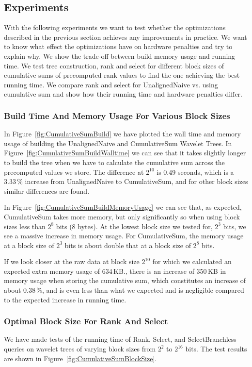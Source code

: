 \subsection{Experiments}
With the following experiments we want to test whether the optimizations described in the previous section achieves any improvements in practice.
We want to know what effect the optimizations have on hardware penalties and try to explain why.
We show the trade-off between build memory usage and running time.
We test tree construction, rank and select for different block sizes of cumulative sums of precomputed rank values to find the one achieving the best running time.
We compare rank and select for UnalignedNaive vs. using cumulative sum and show how their running time and hardware penalties differ.


\subsubsection{Build Time And Memory Usage For Various Block Sizes}
In Figure~\ref{fig:CumulativeSumBuild} we have plotted the wall time and memory usage of building the UnalignedNaive and CumulativeSum Wavelet Trees.
In Figure~\ref{fig:CumulativeSumBuildWalltime} we can see that it takes slightly longer to build the tree when we have to calculate the cumulative sum across the precomputed values we store.
The difference at $2^{10}$ is 0.49 seconds, which is a $3.33\,\%$ increase from UnalignedNaive to CumulativeSum, and for other block sizes similar differences are found.

In Figure~\ref{fig:CumulativeSumBuildMemoryUsage} we can see that, as expected, CumulativeSum takes more memory, but only significantly so when using block sizes less than $2^8$ bits (8 bytes).
At the lowest block size we tested for, $2^3$ bits, we see a massive increase in memory usage.
For CumulativeSum, the memory usage at a block size of $2^3$ bits is about double that at a block size of $2^8$ bits.

If we look closer at the raw data at block size $2^{10}$ for which we calculated an expected extra memory usage of 634\,KB., there is an increase of 350\,KB in memory usage when storing the cumulative sum, which constitutes an increase of about 0.38\,\%, and is even less than what we expected and is negligible compared to the expected increase in running time.



\subsubsection{Optimal Block Size For Rank And Select}
\label{sec:OptimalBlockSizeForRankAndSelect}
We have made tests of the running time of Rank, Select, and SelectBranchless queries on wavelet trees of varying block sizes from $2^2$ to $2^{16}$ bits.
The test results are shown in Figure~\ref{fig:CumulativeSumBlockSize}.

